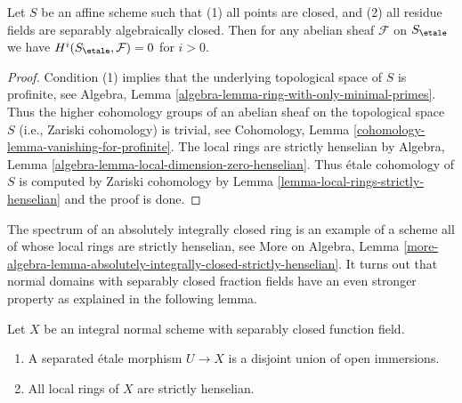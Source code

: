 \begin{lemma}
\label{lemma-affine-only-closed-points}
Let $S$ be an affine scheme such that
(1) all points are closed, and (2) all residue fields are separably
algebraically closed. Then
for any abelian sheaf $\mathcal{F}$ on $S_\etale$ we have
$H^i(S_\etale, \mathcal{F}) = 0$ for $i > 0$.
\end{lemma}

\begin{proof}
Condition (1) implies that the underlying topological space
of $S$ is profinite, see
Algebra, Lemma \ref{algebra-lemma-ring-with-only-minimal-primes}.
Thus the higher cohomology groups of an abelian sheaf on the topological
space $S$ (i.e., Zariski cohomology) is trivial, see
Cohomology, Lemma \ref{cohomology-lemma-vanishing-for-profinite}.
The local rings are strictly henselian by
Algebra, Lemma \ref{algebra-lemma-local-dimension-zero-henselian}.
Thus \'etale cohomology of $S$ is computed by Zariski cohomology
by Lemma \ref{lemma-local-rings-strictly-henselian}
and the proof is done.
\end{proof}

\noindent
The spectrum of an absolutely integrally closed ring
is an example of a scheme all of whose local rings are
strictly henselian, see More on Algebra, Lemma
\ref{more-algebra-lemma-absolutely-integrally-closed-strictly-henselian}.
It turns out that normal domains with separably closed fraction
fields have an even stronger property as explained in the
following lemma.

\begin{lemma}
\label{lemma-normal-scheme-with-alg-closed-function-field}
Let $X$ be an integral normal scheme with separably closed
function field.
\begin{enumerate}
\item A separated \'etale morphism $U \to X$ is a
disjoint union of open immersions.
\item All local rings of $X$ are strictly henselian.
\end{enumerate}
\end{lemma}

